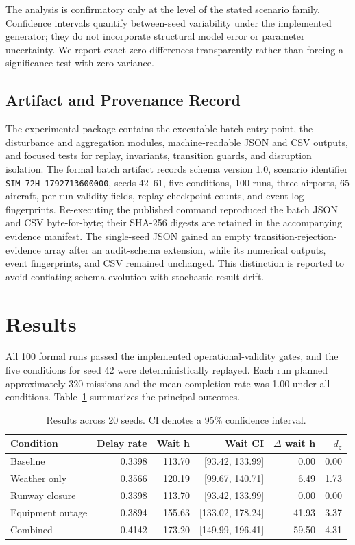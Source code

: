 \documentclass[runningheads]{llncs}
\begin{document}
The analysis is confirmatory only at the level of the stated scenario family. Confidence intervals quantify between-seed variability under the implemented generator; they do not incorporate structural model error or parameter uncertainty. We report exact zero differences transparently rather than forcing a significance test with zero variance.

\subsection{Artifact and Provenance Record}
The experimental package contains the executable batch entry point, the disturbance and aggregation modules, machine-readable JSON and CSV outputs, and focused tests for replay, invariants, transition guards, and disruption isolation. The formal batch artifact records schema version 1.0, scenario identifier \texttt{SIM-72H-1792713600000}, seeds 42--61, five conditions, 100 runs, three airports, 65 aircraft, per-run validity fields, replay-checkpoint counts, and event-log fingerprints. Re-executing the published command reproduced the batch JSON and CSV byte-for-byte; their SHA-256 digests are retained in the accompanying evidence manifest. The single-seed JSON gained an empty transition-rejection-evidence array after an audit-schema extension, while its numerical outputs, event fingerprints, and CSV remained unchanged. This distinction is reported to avoid conflating schema evolution with stochastic result drift.

\section{Results}
All 100 formal runs passed the implemented operational-validity gates, and the five conditions for seed 42 were deterministically replayed. Each run planned approximately 320 missions and the mean completion rate was 1.00 under all conditions. Table~\ref{tab:results} summarizes the principal outcomes.

\begin{table}[t]
\caption{Results across 20 seeds. CI denotes a 95\% confidence interval.}\label{tab:results}
\centering\scriptsize
\begin{tabular}{lrrrrr}
\toprule
Condition & Delay rate & Wait h & Wait CI & $\Delta$ wait h & $d_z$ \\
\midrule
Baseline & 0.3398 & 113.70 & [93.42, 133.99] & 0.00 & 0.00 \\
Weather only & 0.3566 & 120.19 & [99.67, 140.71] & 6.49 & 1.73 \\
Runway closure & 0.3398 & 113.70 & [93.42, 133.99] & 0.00 & 0.00 \\
Equipment outage & 0.3894 & 155.63 & [133.02, 178.24] & 41.93 & 3.37 \\
Combined & 0.4142 & 173.20 & [149.99, 196.41] & 59.50 & 4.31 \\
\bottomrule
\end{tabular}
\end{table}
\end{document}
